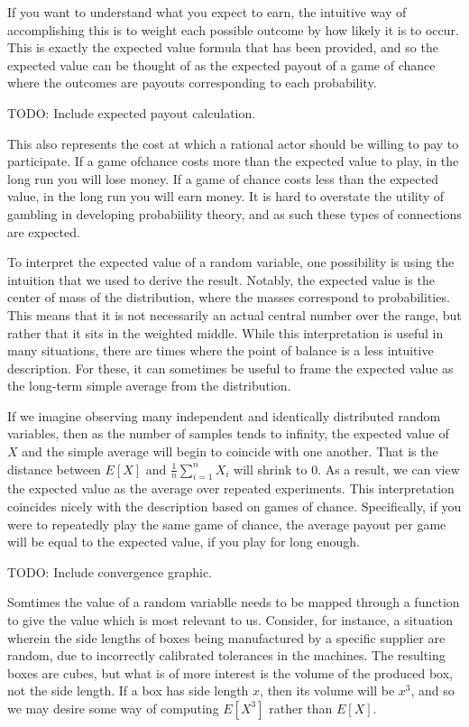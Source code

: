 \documentclass[
  letterpaper,
  DIV=11,
  numbers=noendperiod]{scrreprt}
\begin{document}
If you want to understand what you expect to earn, the intuitive way of
accomplishing this is to weight each possible outcome by how likely it
is to occur. This is exactly the expected value formula that has been
provided, and so the expected value can be thought of as the expected
payout of a game of chance where the outcomes are payouts corresponding
to each probability.

TODO: Include expected payout calculation.

This also represents the cost at which a rational actor should be
willing to pay to participate. If a game ofchance costs more than the
expected value to play, in the long run you will lose money. If a game
of chance costs less than the expected value, in the long run you will
earn money. It is hard to overstate the utility of gambling in
developing probabiility theory, and as such these types of connections
are expected.

To interpret the expected value of a random variable, one possibility is
using the intuition that we used to derive the result. Notably, the
expected value is the center of mass of the distribution, where the
masses correspond to probabilities. This means that it is not
necessarily an actual central number over the range, but rather that it
sits in the weighted middle. While this interpretation is useful in many
situations, there are times where the point of balance is a less
intuitive description. For these, it can sometimes be useful to frame
the expected value as the long-term simple average from the
distribution.

If we imagine observing many independent and identically distributed
random variables, then as the number of samples tends to infinity, the
expected value of \(X\) and the simple average will begin to coincide
with one another. That is the distance between \(E[X]\) and
\(\frac{1}{n}\sum_{i=1}^n X_i\) will shrink to \(0\). As a result, we
can view the expected value as the average over repeated experiments.
This interpretation coincides nicely with the description based on games
of chance. Specifically, if you were to repeatedly play the same game of
chance, the average payout per game will be equal to the expected value,
if you play for long enough.

TODO: Include convergence graphic.

Somtimes the value of a random variablle needs to be mapped through a
function to give the value which is most relevant to us. Consider, for
instance, a situation wherein the side lengths of boxes being
manufactured by a specific supplier are random, due to incorrectly
calibrated tolerances in the machines. The resulting boxes are cubes,
but what is of more interest is the volume of the produced box, not the
side length. If a box has side length \(x\), then its volume will be
\(x^3\), and so we may desire some way of computing \(E[X^3]\) rather
than \(E[X]\).
\end{document}
